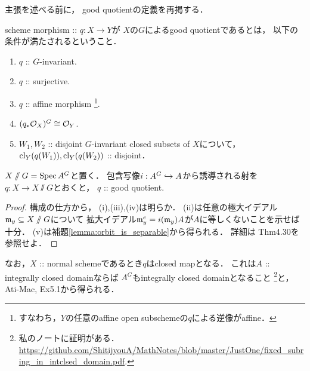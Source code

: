 \documentclass[a4paper]{jsarticle}
\begin{document}
    主張を述べる前に，
    good quotientの定義を再掲する．
    \begin{Def}
        scheme morphism :: $q: X \to Y$が
        $X$の$G$によるgood quotientであるとは，
        以下の条件が満たされるということ．
        \begin{enumerate}[label=(\roman*), leftmargin=*]
        \item $q$ :: $G$-invariant.
        \item $q$ :: surjective.
        \item $q$ :: affine morphism
              \footnote{ すなわち，$Y$の任意のaffine open subschemeの$q$による逆像がaffine． }.
        \item $(q_*\mathcal{O}_X)^G \cong \mathcal{O}_Y$.
        \item
            $W_1, W_2$ :: disjoint $G$-invariant closed subsets of $X$について，
            $\operatorname{cl}_Y(q(W_1)), \operatorname{cl}_Y(q(W_2))$ :: disjoint．
    \end{enumerate}
    \end{Def}

    \begin{Thm}\label{thm:git=good}
        $X \sslash G=\operatorname{Spec} A^G$と置く．
        包含写像$i: A^G \hookrightarrow A$から誘導される射を$q: X \to X \sslash G$とおくと，
        $q$ :: good quotient.
    \end{Thm}
    \begin{proof}
        構成の仕方から，
        (i),(iii),(iv)は明らか．
        (ii)は任意の極大イデアル$\mathfrak{m}_y \subseteq X \sslash G$について
        拡大イデアル$\mathfrak{m}_y^e=i(\mathfrak{m}_y)A$が$A$に等しくないことを示せば十分．
        (v)は補題\ref{lemma:orbit_is_separable}から得られる．
        詳細は\cite{Hos} Thm4.30を参照せよ．
    \end{proof}

    なお，$X$ :: normal schemeであるとき$q$はclosed mapとなる．
    これは$A$ :: integrally closed domainならば
    $A^G$もintegrally closed domainとなること
    \footnote
    {
        私のノートに証明がある．
        \url{https://github.com/ShitijyouA/MathNotes/blob/master/JustOne/fixed_subring_in_intclsed_domain.pdf}.
    }と，
    Ati-Mac, Ex5.1から得られる．




\end{document}
